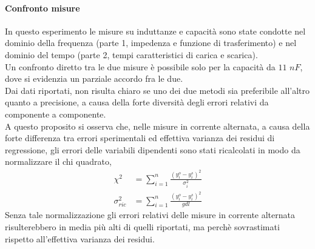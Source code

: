 \paragraph{Confronto misure} In questo esperimento le misure su induttanze e capacità sono state condotte nel dominio della frequenza (parte 1, impedenza e funzione di trasferimento) e nel dominio del tempo (parte 2, tempi caratteristici di carica e scarica). \\
%
Un confronto diretto tra le due misure è possibile solo per la capacità da $11$ $nF$, dove si evidenzia un parziale accordo fra le due.\\
%
Dai dati riportati, non risulta chiaro se uno dei due metodi sia preferibile all'altro quanto a precisione, a causa della forte diversità degli errori relativi da componente a componente.\\
%
A questo proposito si osserva che, nelle misure in corrente alternata, a causa della forte differenza tra errori sperimentali ed effettiva varianza dei residui di regressione, gli errori delle variabili dipendenti sono stati ricalcolati in modo da normalizzare il chi quadrato,
%
\begin{align*}
\chi^{2} &= \sum_{i=1}^{n}\frac{ ( y_{i}^{o} - y_{i}^{s})^{2} }{\sigma_{i}^{2}}    \\
\sigma^{2}_{ric} & = \sum_{i=1}^{n}\frac{ ( y_{i}^{o} - y_{i}^{s})^{2} }{gdl} 
\end{align*}
%
Senza tale normalizzazione gli errori relativi delle misure in corrente alternata risulterebbero in media più alti di quelli riportati, ma perchè sovrastimati rispetto all'effettiva varianza dei residui.
%
